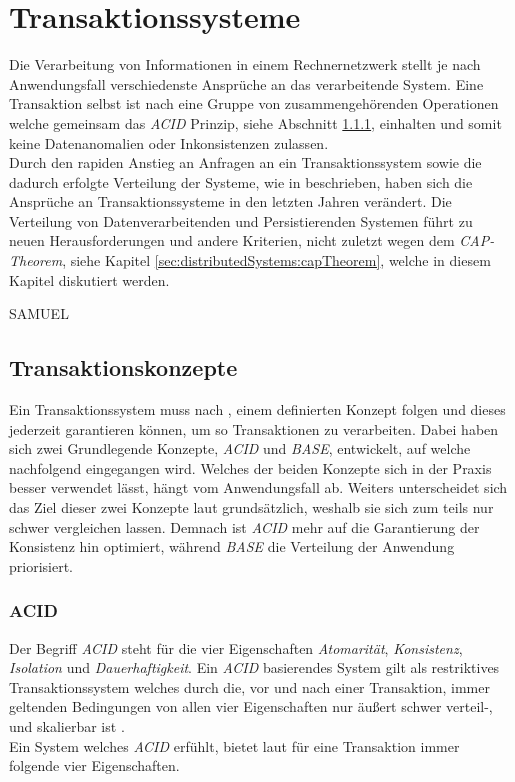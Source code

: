\chapter{Transaktionssysteme}
Die Verarbeitung von Informationen in einem Rechnernetzwerk stellt je nach Anwendungsfall verschiedenste Ansprüche an das verarbeitende System. Eine Transaktion selbst ist nach \cite{rahm1993HochleistungsTransaktionssysteme} eine Gruppe von zusammengehörenden Operationen welche gemeinsam das \textit{ACID} Prinzip, siehe Abschnitt \ref{sec:transactionTheory:acid}, einhalten und somit keine Datenanomalien oder Inkonsistenzen zulassen. \\
Durch den rapiden Anstieg an Anfragen an ein Transaktionssystem sowie die dadurch erfolgte Verteilung der Systeme, wie in \cite{li2017research} beschrieben, haben sich die Ansprüche an Transaktionssysteme in den letzten Jahren verändert. Die Verteilung von Datenverarbeitenden und Persistierenden Systemen führt zu neuen Herausforderungen und andere Kriterien, nicht zuletzt wegen dem \textit{CAP-Theorem}, siehe Kapitel \ref{sec:distributedSystems:capTheorem}, welche in diesem Kapitel diskutiert werden. 

SAMUEL

\section{Transaktionskonzepte}
Ein Transaktionssystem muss nach \cite{rahm1993HochleistungsTransaktionssysteme}, einem definierten Konzept folgen und dieses jederzeit garantieren können, um so Transaktionen zu verarbeiten. Dabei haben sich zwei Grundlegende Konzepte, \textit{ACID} und \textit{BASE}, entwickelt, auf welche nachfolgend eingegangen wird. Welches der beiden Konzepte sich in der Praxis besser verwendet lässt, hängt vom Anwendungsfall ab. Weiters
unterscheidet sich das Ziel dieser zwei Konzepte laut \cite{EdlichFriedlandHampeBrauer201010} grundsätzlich, weshalb sie sich zum teils nur schwer vergleichen lassen. Demnach ist \textit{ACID} mehr auf die Garantierung der Konsistenz hin optimiert, während \textit{BASE} die Verteilung der Anwendung priorisiert.

\subsection{ACID}\label{sec:transactionTheory:acid}
Der Begriff \textit{ACID} steht für die vier Eigenschaften \textit{Atomarität}, \textit{Konsistenz}, \textit{Isolation} und \textit{Dauerhaftigkeit}. Ein \textit{ACID} basierendes System gilt als restriktives Transaktionssystem welches durch die, vor und nach einer Transaktion,  immer geltenden Bedingungen von allen vier Eigenschaften nur äußert schwer verteil-, und skalierbar ist \cite{PritchettBASE}.\\
Ein System welches \textit{ACID} erfühlt, bietet laut \cite{haerder198Acid} für eine Transaktion immer folgende vier Eigenschaften.

